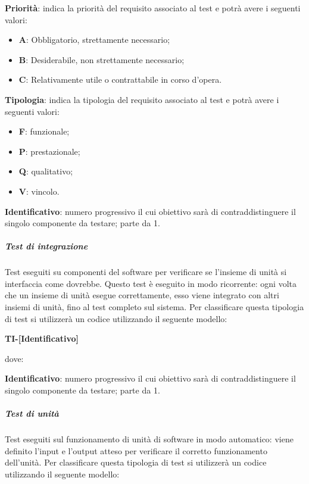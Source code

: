                 \textbf{Priorità}: indica la priorità del requisito associato al test e potrà avere i seguenti valori:
                \begin{itemize}
                    \item \textbf{A}: Obbligatorio, strettamente necessario;
                    \item \textbf{B}: Desiderabile, non strettamente necessario;
                    \item \textbf{C}: Relativamente utile o contrattabile in corso d'opera. 
                 \end{itemize} 
                 \textbf{Tipologia}: indica la tipologia del requisito associato al test e potrà avere i seguenti valori:
                 \begin{itemize}
                    \item \textbf{F}: funzionale;
                    \item \textbf{P}: prestazionale;
                    \item \textbf{Q}: qualitativo;
                    \item \textbf{V}: vincolo.
                 \end{itemize}
                \textbf{Identificativo}: numero progressivo il cui obiettivo sarà di contraddistinguere il singolo componente da testare; parte da 1.

                 \subparagraph*{Test di integrazione}
        			Test eseguiti su componenti del software per verificare se l'insieme di unità si interfaccia come dovrebbe. Questo test è eseguito in modo ricorrente: ogni volta che un insieme di unità esegue correttamente, esso viene integrato con altri insiemi di unità, fino al test completo sul sistema.
                    Per classificare questa tipologia di test si utilizzerà un codice utilizzando il seguente modello:     

                        \begin{center}
                        \textbf{TI-[Identificativo]}
                        \end{center}
                        dove:

                        \textbf{Identificativo}: numero progressivo il cui obiettivo sarà di contraddistinguere il singolo componente da testare; parte da 1.

                    \subparagraph*{Test di unità}
                            Test eseguiti sul funzionamento di unità di software in modo automatico: viene definito l'input e l'output atteso per verificare il corretto funzionamento dell'unità.
                            Per classificare questa tipologia di test si utilizzerà un codice utilizzando il seguente modello:     

